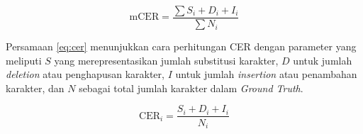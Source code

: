 \begin{equation}
    \label{eq:mcer}
\text{mCER} = \frac{\sum{S_i + D_i + I_i}}{\sum{N_i}}
\end{equation}

Persamaan \eqref{eq:cer} menunjukkan cara perhitungan CER dengan parameter yang meliputi $S$ yang merepresentasikan jumlah substitusi karakter, $D$ untuk jumlah \emph{deletion} atau penghapusan karakter, $I$ untuk jumlah \emph{insertion} atau penambahan karakter, dan $N$ sebagai total jumlah karakter dalam \emph{Ground Truth}.

\begin{equation}
    \label{eq:cer}
\text{CER}_i = \frac{S_i + D_i + I_i}{N_i}
\end{equation}





